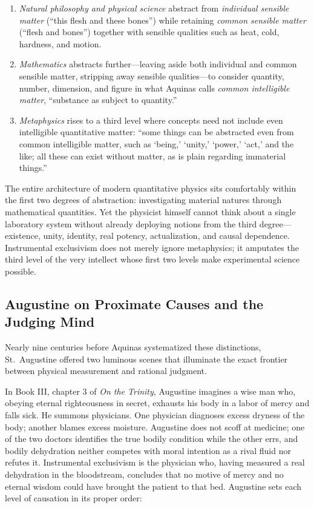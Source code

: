 \begin{enumerate}
\item \emph{Natural philosophy and physical science} abstract from \emph{individual sensible matter} (``this flesh and these bones'') while retaining \emph{common sensible matter} (``flesh and bones'') together with sensible qualities such as heat, cold, hardness, and motion.
\item \emph{Mathematics} abstracts further---leaving aside both individual and common sensible matter, stripping away sensible qualities---to consider quantity, number, dimension, and figure in what Aquinas calls \emph{common intelligible matter}, ``substance as subject to quantity.''
\item \emph{Metaphysics} rises to a third level where concepts need not include even intelligible quantitative matter: ``some things can be abstracted even from common intelligible matter, such as `being,' `unity,' `power,' `act,' and the like; all these can exist without matter, as is plain regarding immaterial things.''
\end{enumerate}

The entire architecture of modern quantitative physics sits comfortably within the first two degrees of abstraction: investigating material natures through mathematical quantities. Yet the physicist himself cannot think about a single laboratory system without already deploying notions from the third degree---existence, unity, identity, real potency, actualization, and causal dependence. Instrumental exclusivism does not merely ignore metaphysics; it amputates the third level of the very intellect whose first two levels make experimental science possible.

\subsection{Augustine on Proximate Causes and the Judging Mind}

Nearly nine centuries before Aquinas systematized these distinctions, St.\ Augustine offered two luminous scenes that illuminate the exact frontier between physical measurement and rational judgment.

In Book III, chapter 3 of \emph{On the Trinity}, Augustine imagines a wise man who, obeying eternal righteousness in secret, exhausts his body in a labor of mercy and falls sick. He summons physicians. One physician diagnoses excess dryness of the body; another blames excess moisture. Augustine does not scoff at medicine; one of the two doctors identifies the true bodily condition while the other errs, and bodily dehydration neither competes with moral intention as a rival fluid nor refutes it. Instrumental exclusivism is the physician who, having measured a real dehydration in the bloodstream, concludes that no motive of mercy and no eternal wisdom could have brought the patient to that bed. Augustine sets each level of causation in its proper order:

